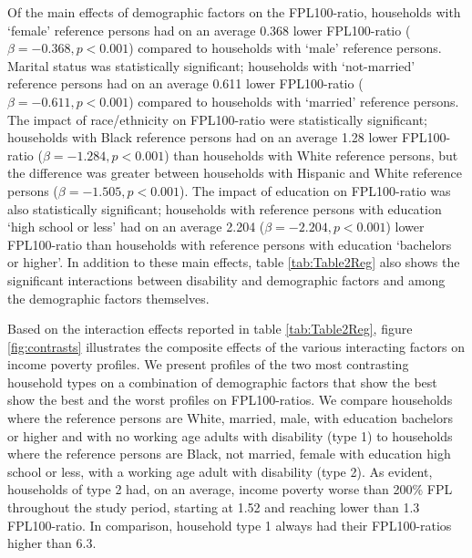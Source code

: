 \documentclass[11pt]{extarticle} %
\begin{document}
Of the main effects of demographic factors on the FPL100-ratio, households with `female' reference persons had on an average 0.368 lower FPL100-ratio ($\beta = -0.368, p < 0.001$) compared to households with `male' reference persons. Marital status was statistically significant; households with `not-married' reference persons had on an average 0.611 lower FPL100-ratio ($\beta = -0.611, p < 0.001$) compared to households with `married' reference persons. The impact of race/ethnicity on FPL100-ratio were statistically significant; households with Black reference persons had on an average 1.28 lower FPL100-ratio ($\beta = -1.284, p < 0.001$) than households with White reference persons, but the difference was greater between households with Hispanic and White reference persons ($\beta = -1.505, p < 0.001$). The impact of education on FPL100-ratio was also statistically significant; households with reference persons with education `high school or less' had on an average 2.204 ($\beta = -2.204, p < 0.001$) lower FPL100-ratio than households with reference persons with education `bachelors or higher'. In addition to these main effects, table \ref{tab:Table2Reg} also shows the significant interactions between disability and demographic factors and among the demographic factors themselves.

Based on the interaction effects reported in table \ref{tab:Table2Reg}, figure \ref{fig:contrasts} illustrates the composite effects of the various interacting factors on income poverty profiles. We present profiles of the two most contrasting household types on a combination of demographic factors that show the best show the best and the worst profiles on FPL100-ratios. We compare households where the reference persons are White, married, male, with education bachelors or higher and with no working age adults with disability (type 1) to households where the reference persons are Black, not married, female with education high school or less, with a working age adult with disability (type 2). As evident, households of type 2 had, on an average, income poverty worse than 200\% FPL throughout the study period, starting at 1.52 and reaching lower than 1.3 FPL100-ratio. In comparison, household type 1 always had their FPL100-ratios higher than 6.3. 
\end{document}
